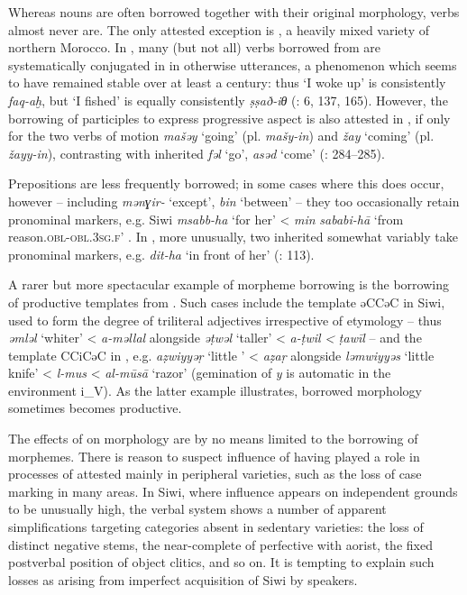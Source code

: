 \documentclass[output=paper]{langsci/langscibook}
\begin{document}
Whereas nouns are often borrowed together with their original  morphology, verbs almost never are. The only attested exception is , a heavily mixed variety of northern Morocco.  In , many (but not all) verbs borrowed from  are systematically conjugated in  in otherwise  utterances, a phenomenon which seems to have remained stable over at least a century: thus `I woke up' is consistently \textit{faq-aḫ}, but `I fished' is equally consistently \textit{ṣṣað-iθ} (\citealt{Mourigh2016}: 6, 137, 165). However, the borrowing of  participles to express progressive aspect is also attested in , if only for the two verbs of motion \textit{mašəy} `going' (pl. \textit{mašy-in}) and \textit{žay} `coming' (pl. \textit{žayy-in}), contrasting with inherited \textit{fəl} `go', \textit{asəd} `come' (\citealt{Kossmann2013book}: 284–285).

Prepositions are less frequently borrowed; in some cases where this does occur, however – including  \textit{mənɣir-} `except',  \textit{bin} `between' \citep[293]{Kossmann2013book} – they too occasionally retain  pronominal markers, e.g. Siwi \textit{msabb-ha} `for her' < \textit{min} \textit{sababi-hā}  `from reason.\textsc{obl}{}-\textsc{obl.3sg.f}' \citep[48]{Souag2013book}.  In , more unusually, two inherited  somewhat variably take  pronominal markers, e.g. \textit{dit-ha} `in front of her' (\citealt{vanPutten2014}: 113).

A rarer but more spectacular example of morpheme borrowing is the borrowing of productive templates from . Such cases include the  template əCCəC in Siwi, used to form the  degree of triliteral adjectives irrespective of etymology – thus \textit{əmləl} `whiter' < \textit{a-məllal} alongside \textit{əṭwəl} `taller' < \textit{a-ṭwil} \textit{<}  \textit{ṭawīl} \citep{Souag2009} – and the  template CCiCəC in  \citep{Mourigh2016}, e.g. \textit{aẓwiyyəṛ} `little ' < \textit{aẓaṛ} alongside \textit{ləmwiyyəs} `little knife' < \textit{l-mus} <  \textit{al-mūsā} `razor' (gemination of \textit{y} is automatic in the environment i\_V). As the latter example illustrates, borrowed  morphology sometimes becomes productive.

The effects of  on  morphology are by no means limited to the borrowing of morphemes. There is reason to suspect  influence of having played a role in processes of  attested mainly in peripheral varieties, such as the loss of case marking in many areas. In Siwi, where  influence appears on independent grounds to be unusually high, the verbal system shows a number of apparent simplifications targeting categories absent in sedentary  varieties: the loss of distinct negative stems, the near-complete  of perfective with aorist, the fixed postverbal position of object clitics, and so on. It is tempting to explain such losses as arising from imperfect acquisition of Siwi by  speakers.
\end{document}
